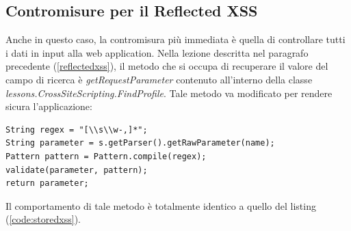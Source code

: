 \documentclass[a4paper,openright,italian]{article}
\begin{document}
\subsection{Contromisure per il Reflected XSS}
Anche in questo caso, la contromisura pi\`u immediata \`e quella di controllare tutti i dati in input alla web application. Nella lezione descritta nel paragrafo precedente (\ref{reflectedxss}), il metodo che si occupa di recuperare il valore del campo di ricerca \`e {\it getRequestParameter} contenuto all'interno della classe {\it lessons.CrossSiteScripting.FindProfile}. Tale metodo va modificato per rendere sicura l'applicazione:
\begin{lstlisting}[caption={getRequestParameter modificato}, label={code:reflectedxss},frame=trBL]
String regex = "[\\s\\w-,]*";
String parameter = s.getParser().getRawParameter(name);
Pattern pattern = Pattern.compile(regex);
validate(parameter, pattern);
return parameter;
\end{lstlisting}
Il comportamento di tale metodo \`e totalmente identico a quello del listing (\ref{code:storedxss}).
\end{document}
